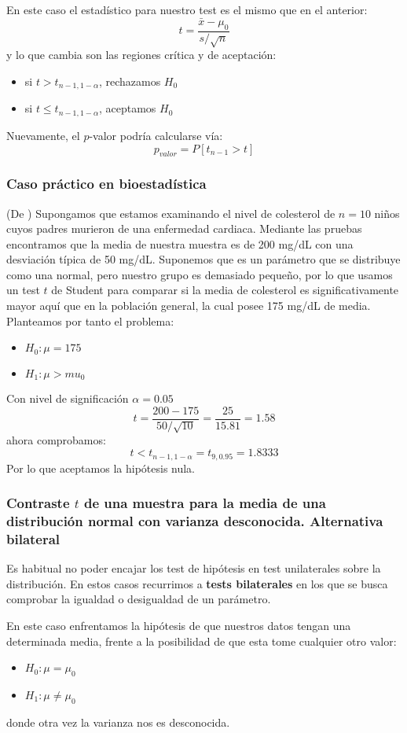 \documentclass[a4paper,12pt]{article}
\begin{document}
 En este caso el estadístico para nuestro test es el mismo que en el anterior:
 $$t=\frac{\bar{x}-\mu_0}{s/\sqrt{n}}$$
 y lo que cambia son las regiones crítica y de aceptación:
 \begin{itemize}
 	\item si $t>t_{n-1,1-\alpha}$, rechazamos $H_0$
 	\item si $t\leq t_{n-1,1-\alpha}$, aceptamos $H_0$
 \end{itemize}

 Nuevamente, el $p$-valor podría calcularse vía:
 $$p_{valor}=P[t_{n-1}> t]$$
 
 \subsubsection*{Caso práctico en bioestadística}
 (De \cite{rosner2015fundamentals}) 
Supongamos que estamos examinando el nivel de colesterol de $n=10$ niños cuyos padres murieron de una enfermedad cardiaca. Mediante las pruebas encontramos que la media de nuestra muestra es de 200 mg/dL con una desviación típica de 50 mg/dL. Suponemos que es un parámetro que se distribuye como una normal, pero nuestro grupo es demasiado pequeño, por lo que usamos un test $t$ de Student para comparar si la media de colesterol es significativamente mayor aquí que en la población general, la cual posee 175 mg/dL de media.
Planteamos por tanto el problema:
\begin{itemize}
	\item $H_0:\mu=175$
	\item $H_1: \mu>mu_0$
\end{itemize}
Con nivel de significación $\alpha=0.05$
$$t=\frac{200-175}{50/\sqrt{10}}=\frac{25}{15.81}=1.58$$
ahora comprobamos:
$$t<t_{n-1,1-\alpha}=t_{9,0.95}=1.8333$$
Por lo que aceptamos la hipótesis nula.

\subsubsection{Contraste $t$ de una muestra para la media de una distribución normal con varianza desconocida. Alternativa bilateral}
Es habitual no poder encajar los test de hipótesis en test unilaterales sobre la distribución. 
En estos casos recurrimos a \textbf{tests bilaterales} en los que se busca comprobar la igualdad o desigualdad de un parámetro.

En este caso enfrentamos la hipótesis de que nuestros datos tengan una determinada media, frente a la posibilidad de que esta tome cualquier otro valor:
\begin{itemize}
	\item $H_0:\mu=\mu_0$
	\item $H_1: \mu\neq \mu_0$
\end{itemize}
donde otra vez la varianza nos es desconocida.
\end{document}
